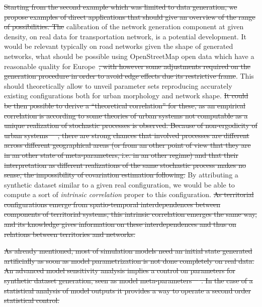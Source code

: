 \documentclass{bmcart}
\providecommand{\DIFaddtex}[1]{{\protect\color{blue}\uwave{#1}}} %
\providecommand{\DIFdeltex}[1]{{\protect\color{red}\sout{#1}}}                      %
\providecommand{\DIFaddbegin}{} %
\providecommand{\DIFaddend}{} %
\providecommand{\DIFdelbegin}{} %
\providecommand{\DIFdelend}{} %
\providecommand{\DIFadd}[1]{\texorpdfstring{\DIFaddtex{#1}}{#1}} %
\providecommand{\DIFdel}[1]{\texorpdfstring{\DIFdeltex{#1}}{}} %
\newcommand{\DIFscaledelfig}{0.5}
\newlength{\DIFdelgraphicswidth} %
\newlength{\DIFdelgraphicsheight} %
\newcommand{\DIFaddincludegraphics}[2][]{{\color{blue}\fbox{\DIFOincludegraphics[#1]{#2}}}} %
\newcommand{\DIFdelincludegraphics}[2][]{%
\sbox{\DIFdelgraphicsbox}{\DIFOincludegraphics[#1]{#2}}%
\settoboxwidth{\DIFdelgraphicswidth}{\DIFdelgraphicsbox} %
\settoboxtotalheight{\DIFdelgraphicsheight}{\DIFdelgraphicsbox} %
\scalebox{\DIFscaledelfig}{%
\parbox[b]{\DIFdelgraphicswidth}{\usebox{\DIFdelgraphicsbox}\\[-\baselineskip] \rule{\DIFdelgraphicswidth}{0em}}\llap{\resizebox{\DIFdelgraphicswidth}{\DIFdelgraphicsheight}{%
\setlength{\unitlength}{\DIFdelgraphicswidth}%
\begin{picture}(1,1)%
\thicklines\linethickness{2pt} %
{\color[rgb]{1,0,0}\put(0,0){\framebox(1,1){}}}%
{\color[rgb]{1,0,0}\put(0,0){\line( 1,1){1}}}%
{\color[rgb]{1,0,0}\put(0,1){\line(1,-1){1}}}%
\end{picture}%
}\hspace*{3pt}}} %
} %
\DeclareRobustCommand{\DIFaddbegin}{\DIFOaddbegin \let\includegraphics\DIFaddincludegraphics} %
\DeclareRobustCommand{\DIFaddend}{\DIFOaddend \let\includegraphics\DIFOincludegraphics} %
\DeclareRobustCommand{\DIFdelbegin}{\DIFOdelbegin \let\includegraphics\DIFdelincludegraphics} %
\DeclareRobustCommand{\DIFdelend}{\DIFOaddend \let\includegraphics\DIFOincludegraphics} %
\begin{document}
\DIFdelbegin \DIFdel{Starting from the second example which was limited to data generation, we propose examples of direct applications that should give an overview of the range of possibilities. The }\DIFdelend \DIFaddbegin \DIFadd{Regarding the application to geographical data, the }\DIFaddend calibration of the network generation component at given density, on real data for transportation network, is a potential development. It would be relevant typically on road networks given the shape of generated networks, what should be possible using OpenStreetMap open data which have a reasonable quality for Europe~\cite{girres2010quality}\DIFdelbegin \DIFdel{, with however some adjustments required on the generation procedure in order to avoid edge effects due its restrictive frame}\DIFdelend . This should theoretically allow to unveil parameter sets reproducing accurately existing configurations both for urban morphology and network shape. \DIFdelbegin \DIFdel{It could be then possible to derive a ``theoretical correlation'' for these, as an empirical correlation is according to some theories of urban systems not computable as a unique realization of stochastic processes is observed. Because of non-ergodicity of urban systems~\mbox{%
\cite{pumain2012urban}}%
, there are strong chances that involved processes are different across different geographical areas (or from an other point of view that they are in an other state of meta-parameters, i.e. in an other regime) and that their interpretation as different realizations of the same stochastic process makes no sense, the impossibility of covariation estimation following. }\DIFdelend By attributing a synthetic dataset similar to a given real configuration, we would be able to compute a sort of \emph{intrinsic correlation} proper to this configuration.
\DIFdelbegin \DIFdel{As territorial configurations emerge from spatio-temporal interdependences between components of territorial systems, this intrinsic correlation emerges the same way, and its knowledge gives information on these interdependences and thus on relations between territories and networks.
}\DIFdelend 


\DIFdelbegin \DIFdel{As already mentioned, most of simulation models need an initial state generated artificially as soon as model parametrization is not done completely on real data. An advanced model sensitivity analysis implies a control on parameters for synthetic dataset generation, seen as model meta-parameters~\mbox{%
\cite{raimbault2018space}}%
. In the case of a statistical analysis of model outputs it provides a way to operate a second order statistical control.
}%
\end{document}
